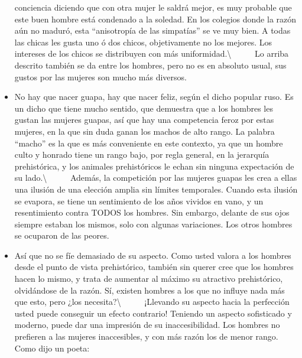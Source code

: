 \begin{itemize}
  conciencia diciendo que con otra mujer le saldrá mejor, es muy
  probable que este buen hombre está condenado a la soledad. En los
  colegios donde la razón aún no maduró, esta ``anisotropía de las
  simpatías'' se ve muy bien. A todas las chicas les gusta uno ó dos
  chicos, objetivamente no los mejores. Los intereses de los chicos se
  distribuyen con más uniformidad.\textbackslash{} ~ ~ ~ Lo arriba
  descrito también se da entre los hombres, pero no es en absoluto
  usual, sus gustos por las mujeres son mucho más diversos.
\item
  No hay que nacer guapa, hay que nacer feliz, según el dicho popular
  ruso. Es un dicho que tiene mucho sentido, que demuestra que a los
  hombres les gustan las mujeres guapas, así que hay una competencia
  feroz por estas mujeres, en la que sin duda ganan los machos de alto
  rango. La palabra ``macho'' es la que es más conveniente en este
  contexto, ya que un hombre culto y honrado tiene un rango bajo, por
  regla general, en la jerarquía prehistórica, y los animales
  prehistóricos le echan sin ninguna expectación de su
  lado.\textbackslash{} ~ ~ ~ Además, la competición por las mujeres
  guapas les crea a ellas una ilusión de una elección amplia sin límites
  temporales. Cuando esta ilusión se evapora, se tiene un sentimiento de
  los años vividos en vano, y un resentimiento contra TODOS los hombres.
  Sin embargo, delante de sus ojos siempre estaban los mismos, solo con
  algunas variaciones. Los otros hombres se ocuparon de las peores.
\item
  Así que no se fíe demasiado de su aspecto. Como usted valora a los
  hombres desde el punto de vista prehistórico, también sin querer cree
  que los hombres hacen lo mismo, y trata de aumentar al máximo su
  atractivo prehistórico, olvidándose de la razón. Sí, existen hombres a
  los que no influye nada más que esto, pero ¿los
  necesita?\textbackslash{} ~ ~ ~ ¡Llevando su aspecto hacia la
  perfección usted puede conseguir un efecto contrario! Teniendo un
  aspecto sofisticado y moderno, puede dar una impresión de su
  inaccesibilidad. Los hombres no prefieren a las mujeres inaccesibles,
  y con más razón los de menor rango. Como dijo un poeta:


\end{itemize}
